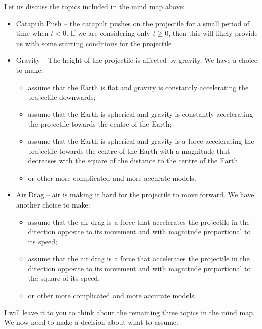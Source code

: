 \begin{example}

Let us discuss the topics included in the mind map above:
\begin{itemize}
	\item Catapult Push -- the catapult pushes on the projectile for a small period of time when $t<0$. If we are considering only $t\geq 0$, then this will likely provide us with some starting conditions for the projectile
	\item Gravity -- The height of the projectile is affected by gravity. We have a choice to make:
	\begin{itemize}
		\item assume that the Earth is flat and gravity is constantly accelerating the projectile downwards;
		\item assume that the Earth is spherical and gravity is constantly accelerating the projectile towards the centre of the Earth;
		\item assume that the Earth is spherical and gravity is a force accelerating the projectile towards the centre of the Earth with a magnitude that decreases with the square of the distance to the centre of the Earth
		\item or other more complicated and more accurate models.
	\end{itemize}
	
	\item Air Drag -- air is making it hard for the projectile to move forward. We have another choice to make:
	\begin{itemize}
		\item assume that the air drag is a force that accelerates the projectile in the direction opposite to its movement and with magnitude proportional to its speed;
		\item assume that the air drag is a force that accelerates the projectile in the direction opposite to its movement and with magnitude proportional to the square of its speed;
		\item or other more complicated and more accurate models.
	\end{itemize}
\end{itemize}
	
I will leave it to you to think about the remaining three topics in the mind map. \\


We now need to make a decision about what to assume. \\


\end{example}
